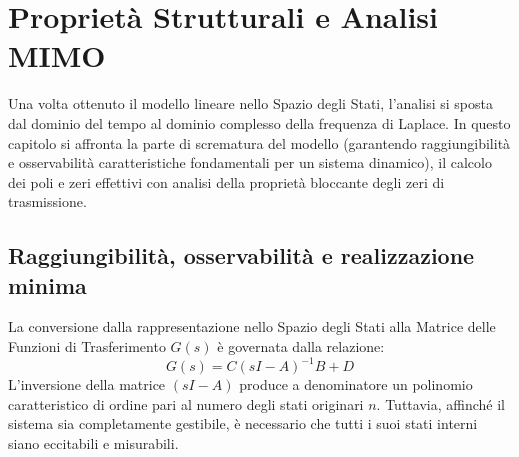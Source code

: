 \chapter{Proprietà Strutturali e Analisi MIMO}
Una volta ottenuto il modello lineare nello Spazio degli Stati, l'analisi si sposta dal dominio del tempo al dominio complesso della frequenza di Laplace. In questo capitolo si affronta la parte di scrematura del modello (garantendo raggiungibilità e osservabilità caratteristiche fondamentali per un sistema dinamico), il calcolo dei poli e zeri effettivi con analisi della proprietà bloccante degli zeri di trasmissione.


\section{Raggiungibilità, osservabilità e realizzazione minima}

La conversione dalla rappresentazione nello Spazio degli Stati alla Matrice delle Funzioni di Trasferimento $G(s)$ è governata dalla relazione:
\begin{equation}
    G(s) = C(sI - A)^{-1}B + D
\end{equation}
L'inversione della matrice $(sI - A)$ produce a denominatore un polinomio caratteristico di ordine pari al numero degli stati originari $n$. Tuttavia, affinché il sistema sia completamente gestibile, è necessario che tutti i suoi stati interni siano eccitabili e misurabili.

